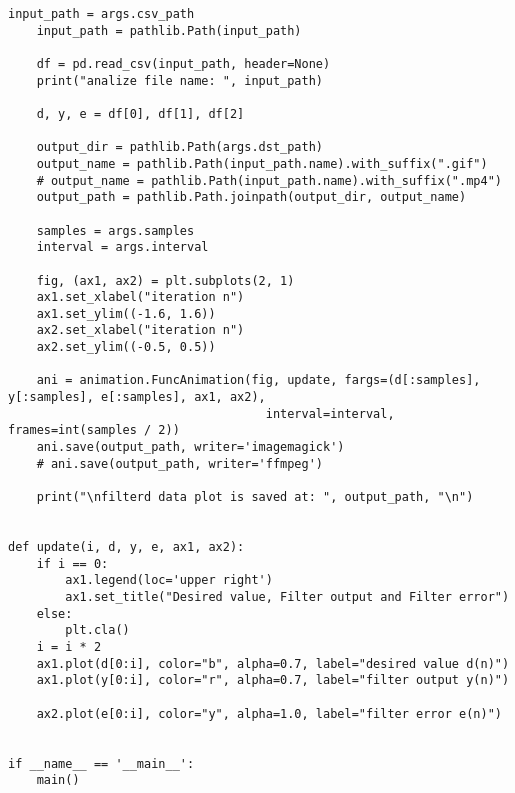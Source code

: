 \begin{lstlisting}[caption=plot\_animation\_from\_csv.py,label=plot_animation_from_csv.py]
    input_path = args.csv_path
    input_path = pathlib.Path(input_path)

    df = pd.read_csv(input_path, header=None)
    print("analize file name: ", input_path)

    d, y, e = df[0], df[1], df[2]

    output_dir = pathlib.Path(args.dst_path)
    output_name = pathlib.Path(input_path.name).with_suffix(".gif")
    # output_name = pathlib.Path(input_path.name).with_suffix(".mp4")
    output_path = pathlib.Path.joinpath(output_dir, output_name)

    samples = args.samples
    interval = args.interval

    fig, (ax1, ax2) = plt.subplots(2, 1)
    ax1.set_xlabel("iteration n")
    ax1.set_ylim((-1.6, 1.6))
    ax2.set_xlabel("iteration n")
    ax2.set_ylim((-0.5, 0.5))

    ani = animation.FuncAnimation(fig, update, fargs=(d[:samples], y[:samples], e[:samples], ax1, ax2),
                                    interval=interval, frames=int(samples / 2))
    ani.save(output_path, writer='imagemagick')
    # ani.save(output_path, writer='ffmpeg')

    print("\nfilterd data plot is saved at: ", output_path, "\n")


def update(i, d, y, e, ax1, ax2):
    if i == 0:
        ax1.legend(loc='upper right')
        ax1.set_title("Desired value, Filter output and Filter error")
    else:
        plt.cla()
    i = i * 2
    ax1.plot(d[0:i], color="b", alpha=0.7, label="desired value d(n)")
    ax1.plot(y[0:i], color="r", alpha=0.7, label="filter output y(n)")

    ax2.plot(e[0:i], color="y", alpha=1.0, label="filter error e(n)")


if __name__ == '__main__':
    main()
\end{lstlisting}

